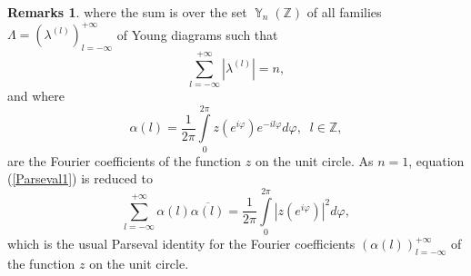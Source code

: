 \documentclass[12pt]{amsart}
\theoremstyle{definition}
\newtheorem*{Remarks}{Remarks}
\numberwithin{equation}{section}
\DeclareMathOperator{\Y}{\mathbb{Y}}
\begin{document}
\begin{Remarks}
where the sum is over the set $\Y_n(\mathbb{Z})$ of all families $\Lambda=\left(\lambda^{(l)}\right)_{l=-\infty}^{+\infty}$ of Young diagrams such that
$$
\sum\limits_{l=-\infty}^{+\infty}\left|\lambda^{(l)}\right|=n,
$$
and where
$$
\alpha(l)=\frac{1}{2\pi}\int\limits_0^{2\pi}z(e^{i\varphi})e^{-il\varphi}d\varphi, \;\;l\in\mathbb{Z},
$$
are the Fourier coefficients of the function $z$ on the unit circle.
As $n=1$, equation (\ref{Parseval1})  is reduced to
\begin{equation}
\sum\limits_{l=-\infty}^{+\infty}\alpha(l)\overline{\alpha(l)}=
\frac{1}{2\pi}\int\limits_0^{2\pi}\left|z(e^{i\varphi})\right|^2d\varphi,
\end{equation}
which is
the usual Parseval identity for the Fourier coefficients $(\alpha(l))_{l=-\infty}^{+\infty}$ of the function $z$ on the unit circle.
\end{Remarks}






\end{document}
